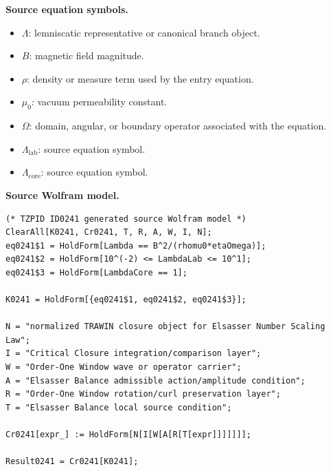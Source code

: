 \begin{minipage}[t]{0.49\linewidth}
\begingroup
\small
\raggedright
\textbf{Source equation symbols.}\par
\begin{itemize}[leftmargin=1.35em,itemsep=1pt,topsep=1pt,parsep=0pt]
    \item $\Lambda$: lemniscatic representative or canonical branch object.
    \item $B$: magnetic field magnitude.
    \item $\rho$: density or measure term used by the entry equation.
    \item $\mu_0$: vacuum permeability constant.
    \item $\Omega$: domain, angular, or boundary operator associated with the equation.
    \item $\Lambda_{\mathrm{lab}}$: source equation symbol.
    \item $\Lambda_{\mathrm{core}}$: source equation symbol.
\end{itemize}
\endgroup
\end{minipage}\hfill
\begin{minipage}[t]{0.47\linewidth}
\begingroup
\scriptsize
\raggedright
\textbf{Source Wolfram model.}\par
\begin{Verbatim}[fontsize=\tiny,breaklines=true,breakanywhere=true]
(* TZPID ID0241 generated source Wolfram model *)
ClearAll[K0241, Cr0241, T, R, A, W, I, N];
eq0241$1 = HoldForm[Lambda == B^2/(rhomu0*etaOmega)];
eq0241$2 = HoldForm[10^(-2) <= LambdaLab <= 10^1];
eq0241$3 = HoldForm[LambdaCore == 1];

K0241 = HoldForm[{eq0241$1, eq0241$2, eq0241$3}];

N = "normalized TRAWIN closure object for Elsasser Number Scaling Law";
I = "Critical Closure integration/comparison layer";
W = "Order-One Window wave or operator carrier";
A = "Elsasser Balance admissible action/amplitude condition";
R = "Order-One Window rotation/curl preservation layer";
T = "Elsasser Balance local source condition";

Cr0241[expr_] := HoldForm[N[I[W[A[R[T[expr]]]]]]];

Result0241 = Cr0241[K0241];
\end{Verbatim}
\endgroup
\end{minipage}

